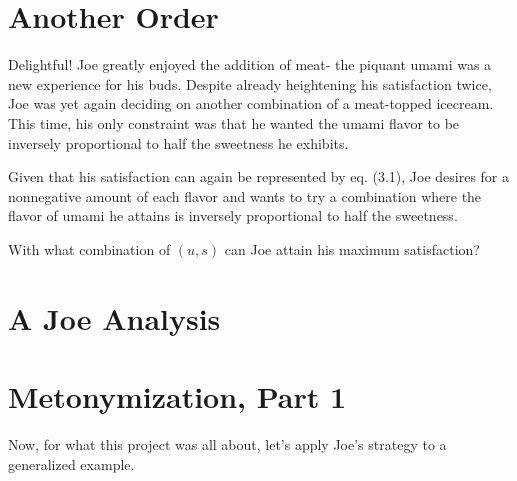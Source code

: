 
\setcounter{chapter}{4}
\chapter{Another Order} %
Delightful! Joe greatly enjoyed the addition of meat- the piquant umami was a new experience for his buds.
Despite already heightening his satisfaction twice, Joe was yet again deciding on another combination of a meat-topped icecream.
This time, his only constraint was that he wanted the umami flavor to be inversely proportional to half the sweetness he exhibits.
\begin{eg} %
	Given that his satisfaction can again be represented by eq. (3.1), Joe desires for a nonnegative amount of each flavor and wants to try a combination where the flavor of umami he attains is inversely proportional to half the sweetness.

	With what combination of $(u, s)$ can Joe attain his maximum satisfaction?
\end{eg}
\setcounter{chapter}{5}
\chapter{A Joe Analysis}

\setcounter{chapter}{6}
\chapter{Metonymization, Part 1} %
Now, for what this project was all about, let's apply Joe's strategy to a generalized example.

